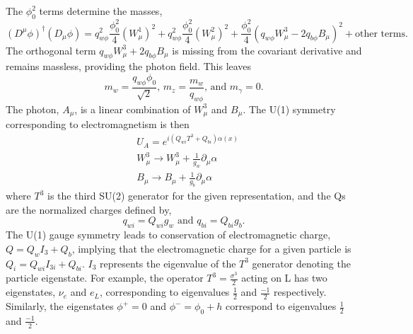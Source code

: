 The $\phi_0^2$ terms determine the masses,
\begin{equation}
(D^\mu\phi)^\dagger(D_\mu\phi) = q^2_{w\phi}\frac{\phi_0^2}{4}(W^1_\mu)^2 + q^2_{w\phi}\frac{\phi_0^2}{4}(W^2_\mu)^2 
                                      + \frac{\phi_0^2}{4}(q_{w\phi}W^3_\mu - 2q_{b\phi}B_\mu)^2 + \text{other terms.}
\end{equation}
The orthogonal term $q_{w\phi}W^3_\mu + 2q_{b\phi}B_\mu$ is missing from the covariant derivative and remains massless, providing the photon field. This leaves 
\begin{equation}
m_{w} = \frac{q_{w\phi}\phi_0}{\sqrt{2}} \text{, }
m_z = \frac{m_w}{q_{w\phi}} \text{, and } m_\gamma = 0.
\end{equation}
The photon, $A_\mu$, is a linear combination of $W^3_\mu$ and $B_\mu$. The U(1) symmetry corresponding to electromagnetism is then 
\begin{equation}
\begin{split}
& U_A = e^{i(Q_{wi}T^3 + Q_{bi})\alpha(x)} \\
& W^3_\mu \rightarrow W^3_\mu + \frac{1}{g_w}\partial_\mu\alpha \\
& B_\mu \rightarrow B_\mu + \frac{1}{g_b}\partial_\mu\alpha
\end{split}
\end{equation}
where $T^3$ is the third SU(2) generator for the given representation, and the Qs are the normalized charges defined by,
\begin{equation}
q_{wi} = Q_{wi}g_w \text{ and } q_{bi} = Q_{bi}g_b.
\end{equation} 
The U(1) gauge symmetry leads to conservation of electromagnetic charge, $Q = Q_{w}I_{3} + Q_{b}$, implying that the electromagnetic charge for a given particle is $Q_i = Q_{wi}I_{3i} + Q_{bi}$. $I_3$ represents the eigenvalue of the $T^3$ generator denoting the particle eigenstate. For example, the operator $T^3 = \frac{\sigma^3}{2}$ acting on L has two eigenstates, $\nu_e$ and $e_L$, corresponding to eigenvalues $\frac{1}{2}$ and $\frac{-1}{2}$ respectively. Similarly, the eigenstates $\phi^+ = 0$ and $\phi^- = \phi_0 + h$ correspond to eigenvalues $\frac{1}{2}$ and $\frac{-1}{2}$. 

